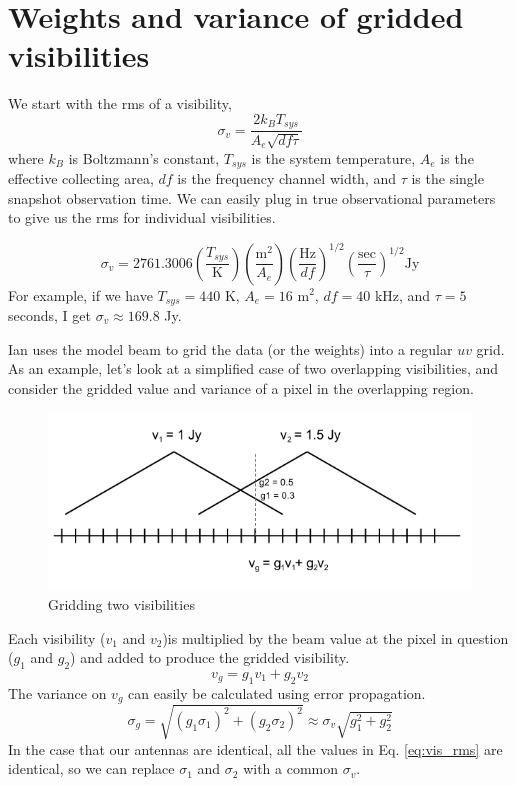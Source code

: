 \documentclass{article}
\begin{document}
\section{Weights and variance of gridded visibilities}
We start with the rms of a visibility,
\begin{equation}\label{eq:vis_rms}
\sigma_v = \frac{2 k_B T_{sys}}{A_e \sqrt{d\!f \tau}}
\end{equation}
where $k_B$ is Boltzmann's constant, $T_{sys}$ is the system temperature, $A_e$ is the effective collecting area, $df$ is the frequency channel width, and $\tau$ is the single snapshot observation time.  We can easily plug in true observational parameters to give us the rms for individual visibilities.

\begin{equation}
\sigma_v = 2761.3006 \left(\frac{T_{sys}}{\text{K}}\right) \left(\frac{\text{m}^2}{A_e}\right) \left(\frac{\text{Hz}}{df}\right)^{1/2} \left(\frac{\text{sec}}{\tau}\right)^{1/2} \text{Jy}
\end{equation}
For example, if we have $T_{sys} = 440$ K, $A_e = 16$ m$^2$, $df = 40$ kHz, and $\tau = 5$ seconds, I get $\sigma_v \approx 169.8$ Jy.

Ian uses the model beam to grid the data (or the weights) into a regular $uv$ grid. As an example, let's look at a simplified case of two overlapping visibilities, and consider the gridded value and variance of a pixel in the overlapping region.
\begin{figure}[h!]
\includegraphics[width=\columnwidth]{vis_grid.png}
\caption{Gridding two visibilities}
\end{figure}

Each visibility ($v_1$ and $v_2$)is multiplied by the beam value at the pixel in question ($g_1$ and $g_2$) and added to produce the gridded visibility.
\begin{equation}
v_g = g_1 v_1 + g_2 v_2
\end{equation}
The variance on $v_g$ can easily be calculated using error propagation.
\begin{equation}\label{eq:grid_var}
\sigma_g = \sqrt{\left(g_1\sigma_1\right)^2 + \left(g_2 \sigma_2\right)^2} \approx \sigma_v \sqrt{g_1^2 + g_2^2}
\end{equation}
In the case that our antennas are identical, all the values in Eq. \ref{eq:vis_rms} are identical, so we can replace $\sigma_1$ and $\sigma_2$ with a common $\sigma_v$.
\end{document}
